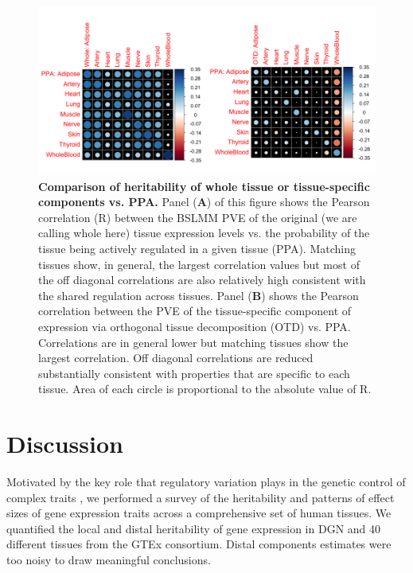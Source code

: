 \documentclass[10pt,letterpaper]{article}
\begin{document}
\begin{figure}[H]
\includegraphics[width=12cm]{Figures/Fig-cor-StephensPr-v-PVE.png}
\caption{{\bf Comparison of heritability of whole tissue or tissue-specific components vs. PPA.} 
Panel (\textbf{A}) of this figure shows the Pearson correlation (R) between the BSLMM PVE of the original (we are calling whole here) tissue expression levels vs. the probability of the tissue being actively regulated in a given tissue (PPA). Matching tissues show, in general, the largest correlation values but most of the off diagonal correlations are also relatively high consistent with the shared regulation across tissues. 
Panel (\textbf{B}) shows the Pearson correlation between the PVE of the tissue-specific component of expression via orthogonal tissue decomposition (OTD) vs. PPA. Correlations are in general lower but matching tissues show the largest correlation. Off diagonal correlations are reduced substantially consistent with properties that are specific to each tissue. 
Area of each circle is proportional to the absolute value of R.
}
\label{fig-corrplot}
\end{figure}



\section*{Discussion}
Motivated by the key role that regulatory variation plays in the genetic control of complex traits \cite{Nicolae_2010,Nica_2010,Gusev_2014}, we performed a survey of the heritability and patterns of effect sizes of gene expression traits across a comprehensive set of human tissues. We quantified the local and distal heritability of gene expression in DGN and 40 different tissues from the GTEx consortium. Distal components estimates were too noisy to draw meaningful conclusions.
\end{document}
